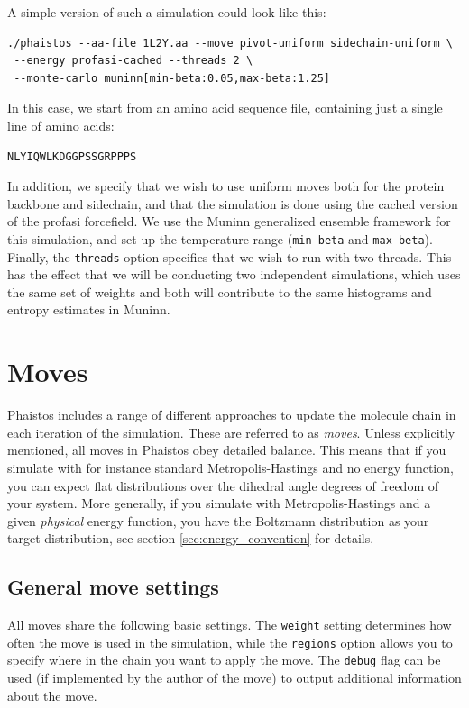 \documentclass[11pt,a4paper,twoside]{book}
\begin{document}
A simple version of such a simulation could look like this:

\begin{verbatim}
./phaistos --aa-file 1L2Y.aa --move pivot-uniform sidechain-uniform \
 --energy profasi-cached --threads 2 \
 --monte-carlo muninn[min-beta:0.05,max-beta:1.25]
\end{verbatim}

\noindent
In this case, we start from an amino acid sequence file, containing
just a single line of amino acids:

\begin{verbatim}
NLYIQWLKDGGPSSGRPPPS
\end{verbatim}

\noindent
In addition, we specify that we wish to use uniform moves both for the
protein backbone and sidechain, and that the simulation is done using
the cached version of the profasi forcefield. We use the Muninn
generalized ensemble framework for this simulation, and set up the
temperature range (\texttt{min-beta} and \texttt{max-beta}). Finally,
the \texttt{threads} option specifies that we wish to run with two
threads. This has the effect that we will be conducting two
independent simulations, which uses the same set of weights and both
will contribute to the same histograms and entropy estimates in
Muninn.


\chapter{Moves}
\label{sec:moves}

Phaistos includes a range of different approaches to update the
molecule chain in each iteration of the simulation. These are referred
to as \emph{moves}. Unless explicitly mentioned, all moves in Phaistos
obey detailed balance. This means that if you simulate with for
instance standard Metropolis-Hastings and no energy function, you can
expect flat distributions over the dihedral angle degrees of freedom
of your system. More generally, if you simulate with
Metropolis-Hastings and a given \emph{physical} energy function, you
have the Boltzmann distribution as your target distribution, see
section \ref{sec:energy_convention} for details.

\section{General move settings}

All moves share the following basic settings. The \texttt{weight}
setting determines how often the move is used in the simulation, while
the \texttt{regions} option allows you to specify where in the chain
you want to apply the move. The \texttt{debug} flag can be used (if
implemented by the author of the move) to output additional
information about the move.
\end{document}
